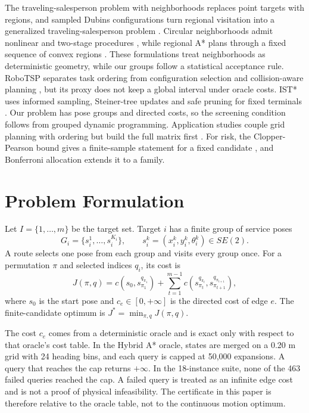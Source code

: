 \documentclass[conference]{IEEEtran}
\begin{document}
The traveling-salesperson problem with neighborhoods replaces point targets with regions, and sampled Dubins configurations turn regional visitation into a generalized traveling-salesperson problem \cite{isaacs2013}. Circular neighborhoods admit nonlinear and two-stage procedures \cite{nedjati2020}, while regional A* plans through a fixed sequence of convex regions \cite{ishida2019}. These formulations treat neighborhoods as deterministic geometry, while our groups follow a statistical acceptance rule. RoboTSP separates task ordering from configuration selection and collision-aware planning \cite{suare2020}, but its proxy does not keep a global interval under oracle costs. IST* uses informed sampling, Steiner-tree updates and safe pruning for fixed terminals \cite{chandak2024}. Our problem has pose groups and directed costs, so the screening condition follows from grouped dynamic programming. Application studies couple grid planning with ordering but build the full matrix first \cite{xiang2022,yang2024,yin2024}. For risk, the Clopper-Pearson bound gives a finite-sample statement for a fixed candidate \cite{clopper1934}, and Bonferroni allocation extends it to a family.

\section{Problem Formulation}

Let $I=\{1,\ldots,m\}$ be the target set. Target $i$ has a finite group of service poses
\begin{equation}
G_i=\{s_i^1,\ldots,s_i^{K_i}\}, \qquad s_i^k=(x_i^k,y_i^k,\theta_i^k)\in SE(2).
\end{equation}
A route selects one pose from each group and visits every group once. For a permutation $\pi$ and selected indices $q_i$, its cost is
\begin{equation}
J(\pi,q)=c(s_0,s_{\pi_1}^{q_{\pi_1}})+\sum_{t=1}^{m-1} c\!\left(s_{\pi_t}^{q_{\pi_t}},s_{\pi_{t+1}}^{q_{\pi_{t+1}}}\right),
\end{equation}
where $s_0$ is the start pose and $c_e\in[0,+\infty]$ is the directed cost of edge $e$. The finite-candidate optimum is $J^\ast=\min_{\pi,q}J(\pi,q)$.

The cost $c_e$ comes from a deterministic oracle and is exact only with respect to that oracle's cost table. In the Hybrid A* oracle, states are merged on a 0.20 m grid with 24 heading bins, and each query is capped at 50,000 expansions. A query that reaches the cap returns $+\infty$. In the 18-instance suite, none of the 463 failed queries reached the cap. A failed query is treated as an infinite edge cost and is not a proof of physical infeasibility. The certificate in this paper is therefore relative to the oracle table, not to the continuous motion optimum.
\end{document}
